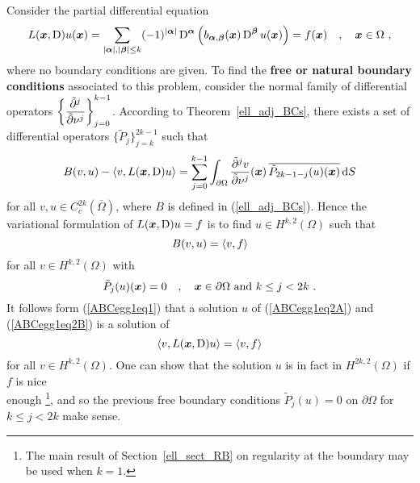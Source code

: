 \begin{egg}
Consider the partial differential equation
\begin{equation} \label{ABCegg1eq0}
L({\bm{x}}, \operatorname{D})u({\bm{x}}) = \sum_{|{\bm{\alpha}}|,|{\bm{\beta}}|\leq k}
(-1)^{|{\bm{\alpha}}|} \operatorname{D}^{{\bm{\alpha}}}
\left( b_{{\bm{\alpha}},{\bm{\beta}}}({\bm{x}}) \operatorname{D}^{{\bm{\beta}}}
u({\bm{x}})\right) = f({\bm{x}})
\quad , \quad {\bm{x}} \in \Omega \ ,
\end{equation}
where no boundary conditions are given.  To find the
{\bfseries free or natural boundary conditions}%
%
associated to this
problem, consider the normal family of differential operators 
$\displaystyle \left\{ \frac{\tilde{\partial}^{j}{}}{\tilde{\partial}{\nu}^{j}} \right\}_{j=0}^{k-1}$.
According to Theorem~\ref{ell_adj_BCs}, there exists a set of
differential operators $\displaystyle \{ \tilde{P}_j\}_{j=k}^{2k-1}$
such that
\begin{equation} \label{ABCegg1eq1}
B(v,u) - \left\langle{v} , {L({\bm{x}},\operatorname{D})u}\right\rangle =
\sum_{j=0}^{k-1} \int_{\partial \Omega} \frac{\tilde{\partial}^{j}{v}}{\tilde{\partial}{\nu}^{j}}({\bm{x}}) \,
\overline{\tilde{P}_{2k-1-j}(u)({\bm{x}})} \,\mathrm{d}{S}
\end{equation}
for all $\displaystyle v,u \in C^{2k}_c(\overline{\Omega})$,
where $B$ is defined in (\ref{ell_adj_BCs}).
Hence the variational formulation of $L({\bm{x}},\operatorname{D})u=f$ is to find
$\displaystyle u\in H^{k,2}(\Omega)$ such that
\begin{equation} \label{ABCegg1eq2A}
B(v,u) = \left\langle{v} , {f}\right\rangle
\end{equation}
for all $\displaystyle v\in H^{k,2}(\Omega)$ with
\begin{equation} \label{ABCegg1eq2B}
\tilde{P}_{j}(u)({\bm{x}}) = 0 \quad , \quad {\bm{x}} \in \partial \Omega \
\text{and} \ k\leq j < 2k \ .
\end{equation}
It follows form (\ref{ABCegg1eq1}) that a solution $u$ of
(\ref{ABCegg1eq2A}) and (\ref{ABCegg1eq2B}) is a solution of
\[
\left\langle{v} , {L({\bm{x}},\operatorname{D})u}\right\rangle = \left\langle{v} , {f}\right\rangle
\]
for all $\displaystyle  v\in H^{k,2}(\Omega)$.
One can show that the solution $u$ is in fact in
$\displaystyle H^{2k,2}(\Omega)$ if $f$ is nice\\
enough \footnote{The main result of Section~\ref{ell_sect_RB} on
regularity at the boundary may be used when $k=1$.}, and so the
previous free boundary conditions $\tilde{P}_{j}(u) = 0$ on
$\partial \Omega$ for $k \leq j < 2k$ make sense.
\end{egg}

